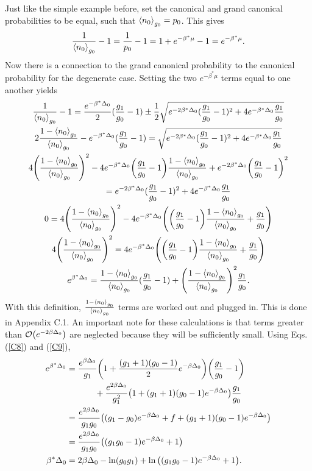 Just like the simple example before, set the canonical and grand canonical probabilities to be equal, such that $\left<{n_0}\right>_{g_0}=p_0$. This gives 
\begin{align}
    \frac{1}{\left<{n_0}\right>_{g_0}}-1=\frac{1}{p_0}-1=1+e^{-\beta^*\mu}-1=e^{-\beta^*\mu} .
\end{align}
Now there is a connection to the grand canonical probability to the canonical probability for the degenerate case. Setting the two $e^{-\beta^*\mu}$ terms equal to one another yields
\begin{gather}
    \frac{1}{\left<{n_0}\right>_{g_0}}-1=\frac{e^{-\beta^*\Delta_0}}{2}(\frac{g_1}{g_0}-1)\pm \frac{1}{2}\sqrt{e^{-2\beta^*\Delta_0} (\frac{g_1}{g_0}-1)^2+ 4e^{-\beta^*\Delta_0}\frac{g_1}{g_0}}\nonumber\\
    2\frac{1-\left<{n_0}\right>_{g_0}}{\left<{n_0}\right>_{g_0}}-e^{-\beta^*\Delta_0}(\frac{g_1}{g_0}-1)=\sqrt{e^{-2\beta^*\Delta_0} (\frac{g_1}{g_0}-1)^2+ 4e^{-\beta^*\Delta_0}\frac{g_1}{g_0}}\nonumber\\
    4\qty(\frac{1-\left<{n_0}\right>_{g_0}}{\left<{n_0}\right>_{g_0}})^2-4e^{-\beta^*\Delta_0}\qty(\frac{g_1}{g_0}-1) \frac{1-\left<{n_0}\right>_{g_0}}{\left<{n_0}\right>_{g_0}}+e^{-2\beta^*\Delta_0} \qty(\frac{g_1}{g_0}-1)^2\nonumber\\ 
    \ \ \ \ \ \ \  =e^{-2\beta^*\Delta_0} (\frac{g_1}{g_0}-1)^2+ 4e^{-\beta^*\Delta_0}\frac{g_1}{g_0} \nonumber\nonumber\\
    0=4\qty(\frac{1-\left<{n_0}\right>_{g_0}}{\left<{n_0}\right>_{g_0}})^2- 4e^{-\beta^*\Delta_0}\qty(\qty(\frac{g_1}{g_0}-1)\frac{1-\left<{n_0}\right>_{g_0}}{\left<{n_0}\right>_{g_0}}+\frac{g_1}{g_0})\nonumber\\
    4\qty(\frac{1-\left<{n_0}\right>_{g_0}}{\left<{n_0}\right>_{g_0}})^2=4e^{-\beta^*\Delta_0}\qty(\qty(\frac{g_1}{g_0}-1)\frac{1-\left<{n_0}\right>_{g_0}}{\left<{n_0}\right>_{g_0}}+\frac{g_1}{g_0})\nonumber\\
    e^{\beta^* \Delta_0}=\frac{1-\left<{n_0}\right>_{g_0}}{\left<{n_0}\right>_{g_0}}(\frac{g_1}{g_0}-1)+\qty(\frac{1-\left<{n_0}\right>_{g_0}}{\left<{n_0}\right>_{g_0}})^2\frac{g_1}{g_0}.
\end{gather}
With this definition, $\frac{1-\left<{n_0}\right>_{g_0}}{\left<{n_0}\right>_{g_0}}$ terms are worked out and plugged in. This is done in Appendix C.1. An important note for these calculations is that terms greater than $\mathcal{O}\qty(e^{-2\beta \Delta_0})$ are neglected because they will be sufficiently small. Using Eqs.\@ (\ref{C8}) and (\ref{C9}),
\begin{align}
    e^{\beta^* \Delta_0}&=\frac{e^{\beta\Delta_0}}{g_1}\qty(1+\frac{(g_1+1)(g_0-1)}{2}e^{-\beta\Delta_0})\qty(\frac{g_1}{g_0}-1)\nonumber\\
    &\ \ \ \ \ \ \ \ \ \ +\frac{e^{2\beta\Delta_0}}{g_1^2}\qty(1+(g_1+1)(g_0-1)e^{-\beta\Delta_0})\frac{g_1}{g_0}\nonumber\\
    &=\frac{e^{2\beta\Delta_0}}{g_1g_0}\qty((g_1-g_0)e^{-\beta\Delta_0}+f+(g_1+1)(g_0-1)e^{-\beta\Delta_0})\nonumber\\
    &=\frac{e^{2\beta\Delta_0}}{g_1g_0}\qty((g_1g_0-1)e^{-\beta\Delta_0}+1)\\
    \beta^*\Delta_0&=2\beta\Delta_0-\ln(g_0g_1)+\ln\qty((g_1g_0-1)e^{-\beta\Delta_0}+1).
\end{align}
